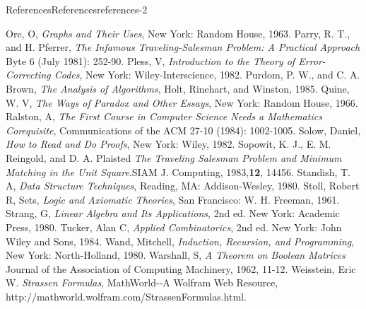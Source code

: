 \documentclass[twoside,10pt,]{book}
\numberwithin{equation}{section}
\begin{document}
\begin{references-chapter-numberless}{References}{}{References}{}{}{references-2}
\begin{referencelist}
\hypertarget{biblio-ore-1963}{}Ore, O, \textit{Graphs and Their Uses}, New York: Random House, 1963.
\hypertarget{biblio-parry-1981}{}Parry, R. T., and H. Pferrer, \textit{The Infamous Traveling-Salesman Problem: A Practical Approach} Byte 6 (July 1981): 252-90.
\hypertarget{biblio-pless-1982}{}Pless, V, \textit{Introduction to the Theory of Error-Correcting Codes}, New York: Wiley-Interscience, 1982.
\hypertarget{biblio-purdom-1985}{}Purdom, P. W., and C. A. Brown, \textit{The Analysis of Algorithms}, Holt, Rinehart, and Winston, 1985.
\hypertarget{biblio-quine-1966}{}Quine, W. V, \textit{The Ways of Paradox and Other Essays}, New York: Random House, 1966.
\hypertarget{biblio-ralson-1984}{}Ralston, A, \textit{The First Course in Computer Science Needs a Mathematics Corequisite}, Communications of the ACM 27-10 (1984): 1002-1005.
\hypertarget{biblio-solow-1982}{}Solow, Daniel, \textit{How to Read and Do Proofs}, New York: Wiley, 1982.
\hypertarget{biblio-sopowit-1983}{}Sopowit, K. J., E. M. Reingold, and D. A. Plaisted \textit{The Traveling Salesman Problem and Minimum Matching in the Unit Square}.SIAM J. Computing, 1983,\textbf{12}, 144\textendash{}56.
\hypertarget{biblio-standish-1980}{}Standish, T. A, \textit{Data Structure Techniques}, Reading, MA: Addison-Wesley, 1980.
\hypertarget{biblio-stoll-1961}{}Stoll, Robert R, Sets, \textit{Logic and Axiomatic Theories}, San Francisco: W. H. Freeman, 1961.
\hypertarget{biblio-strang-1980}{}Strang, G, \textit{Linear Algebra and Its Applications}, 2nd ed. New York: Academic Press, 1980.
\hypertarget{biblio-tucker-1984}{}Tucker, Alan C, \textit{Applied Combinatorics}, 2nd ed. New York: John Wiley and Sons, 1984.
\hypertarget{biblio-wand-1980}{}Wand, Mitchell, \textit{Induction, Recursion, and Programming}, New York: North-Holland, 1980.
\hypertarget{biblio-warshall-1962}{}Warshall, S, \textit{A Theorem on Boolean Matrices}  Journal of the Association of Computing Machinery, 1962, 11-12.
\hypertarget{biblio-weisstein-2010}{}Weisstein, Eric W. \textit{Strassen Formulas},  MathWorld-{}-{}A Wolfram Web Resource, http:\slash{}\slash{}mathworld.wolfram.com\slash{}StrassenFormulas.html.

\end{referencelist}
\end{references-chapter-numberless}
\end{document}
